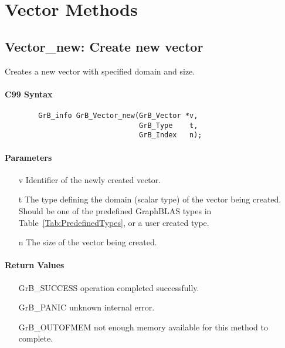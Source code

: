 \section{Vector Methods}



\subsection{{\sf Vector\_new}: Create new vector}

Creates a new vector with specified domain and size.

\paragraph{C99 Syntax}

\begin{verbatim}
        GrB_info GrB_Vector_new(GrB_Vector *v,
                                GrB_Type    t,
                                GrB_Index   n);
\end{verbatim}

\paragraph{Parameters}

\begin{itemize}[leftmargin=1.1in]
    \item[{\sf v}] Identifier of the newly created vector.
    \item[{\sf t}] The type defining the domain (scalar type) of the vector being created.
    Should be one of the predefined
    GraphBLAS types in Table~\ref{Tab:PredefinedTypes}, or a user created type.
    \item[{\sf n}] The size of the vector being created.  
\end{itemize}

\paragraph{Return Values}

\begin{itemize}[leftmargin=2.1in]
\item[{\sf GrB\_SUCCESS}]    operation completed successfully. \\
\item[{\sf GrB\_PANIC}]      unknown internal error. \\
\item[{\sf GrB\_OUTOFMEM}]   not enough memory available for this method to complete. \\
\end{itemize}

